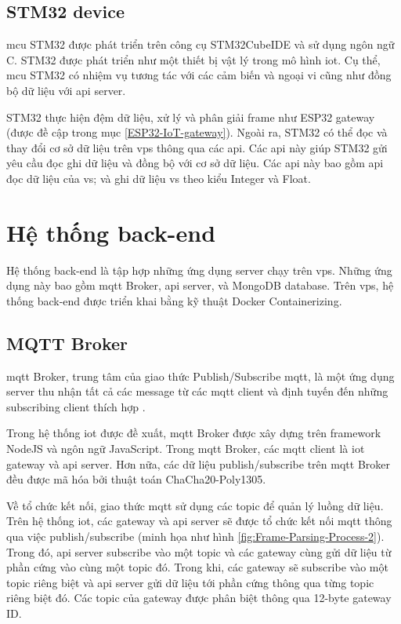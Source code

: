 \subsection{STM32 device}

\acrshort{mcu} STM32 được phát triển trên công cụ STM32CubeIDE và sử dụng ngôn ngữ C. STM32 được phát triển như một thiết bị vật lý trong mô hình \acrshort{iot}. Cụ thể, \acrshort{mcu} STM32 có nhiệm vụ tương tác với các cảm biến và ngoại vi cũng như đồng bộ dữ liệu với \acrshort{api} server.

STM32 thực hiện đệm dữ liệu, xử lý và phân giải frame như ESP32 gateway (được đề cập trong mục \ref{ESP32-IoT-gateway}). Ngoài ra, STM32 có thể đọc và thay đổi cơ sở dữ liệu trên \acrshort{vps} thông qua các \acrshort{api}. Các \acrshort{api} này giúp STM32 gửi yêu cầu đọc ghi dữ liệu và đồng bộ với cơ sở dữ liệu. Các \acrshort{api} này bao gồm \acrshort{api} đọc dữ liệu của \acrshort{vs}; và ghi dữ liệu \acrshort{vs} theo kiểu Integer và Float.

\section{Hệ thống back-end}

Hệ thống back-end là tập hợp những ứng dụng server chạy trên \acrshort{vps}. Những ứng dụng này bao gồm \acrshort{mqtt} Broker, \acrshort{api} server, và MongoDB database. Trên \acrshort{vps}, hệ thống back-end được triển khai bằng kỹ thuật Docker Containerizing.

\subsection{MQTT Broker}

\acrshort{mqtt} Broker, trung tâm của giao thức Publish/Subscribe \acrshort{mqtt}, là một ứng dụng server thu nhận tất cả các message từ các \acrshort{mqtt} client và định tuyến đến những subscribing client thích hợp \cite{MQTT-Broker-Def}.

Trong hệ thống \acrshort{iot} được đề xuất, \acrshort{mqtt} Broker được xây dựng trên framework NodeJS và ngôn ngữ JavaScript. Trong \acrshort{mqtt} Broker, các \acrshort{mqtt} client là \acrshort{iot} gateway và \acrshort{api} server. Hơn nữa, các dữ liệu publish/subscribe trên \acrshort{mqtt} Broker đều được mã hóa bởi thuật toán ChaCha20-Poly1305.

Về tổ chức kết nối, giao thức \acrshort{mqtt} sử dụng các topic để quản lý luồng dữ liệu. Trên hệ thống \acrshort{iot}, các gateway và \acrshort{api} server sẽ được tổ chức kết nối \acrshort{mqtt} thông qua việc publish/subscribe (minh họa như hình \ref{fig:Frame-Parsing-Process-2}). Trong đó, \acrshort{api} server subscribe vào một topic và các gateway cùng gửi dữ liệu từ phần cứng vào cùng một topic đó. Trong khi, các gateway sẽ subscribe vào một topic riêng biệt và \acrshort{api} server gửi dữ liệu tới phần cứng thông qua từng topic riêng biệt đó. Các topic của gateway được phân biệt thông qua 12-byte gateway ID.

